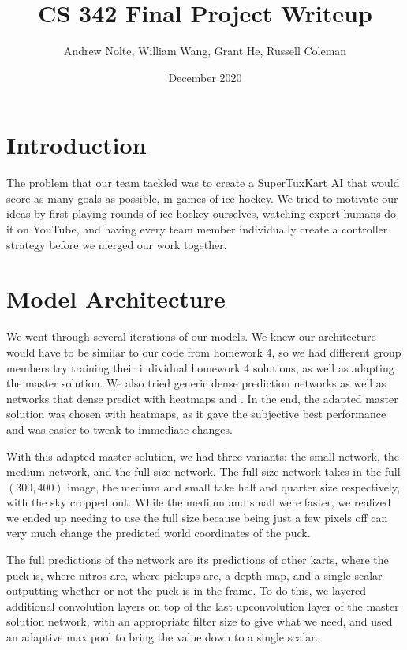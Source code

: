 \documentclass{article}
\title{CS 342 Final Project Writeup}
\author{Andrew Nolte, William Wang, Grant He, Russell Coleman}
\date{December 2020}
\begin{document}
\maketitle

\section{Introduction}
The problem that our team tackled was to create a SuperTuxKart AI that would score as many goals as possible, in games of ice hockey. We tried to motivate our ideas by first playing rounds of ice hockey ourselves, watching expert humans do it on YouTube, and having every team member individually create a controller strategy before we merged our work together.

\section{Model Architecture}
We went through several iterations of our models. We knew our architecture would have to be similar to our code from homework 4, so we had different group members try training their individual homework 4 solutions, as well as adapting the master solution. We also tried generic dense prediction networks as well as networks that dense predict with heatmaps and . In the end, the adapted master solution was chosen with heatmaps, as it gave the subjective best performance and was easier to tweak to immediate changes.

With this adapted master solution, we had three variants: the small network, the medium network, and the full-size network. The full size network takes in the full $(300, 400)$ image, the medium and small take half and quarter size respectively, with the sky cropped out. While the medium and small were faster, we realized we ended up needing to use the full size because being just a few pixels off can very much change the predicted world coordinates of the puck.

The full predictions of the network are its predictions of other karts, where the puck is, where nitros are, where pickups are, a depth map, and a single scalar outputting whether or not the puck is in the frame. To do this, we layered additional convolution layers on top of the last upconvolution layer of the master solution network, with an appropriate filter size to give what we need, and used an adaptive max pool to bring the  value down to a single scalar.
\end{document}
